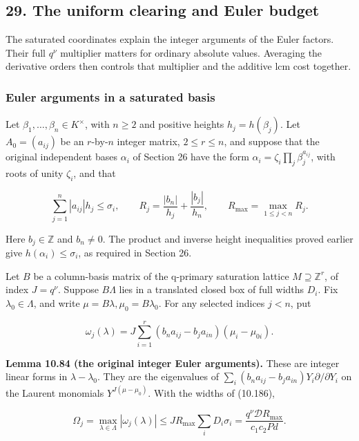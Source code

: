 \documentclass[
  11pt,
  a4paper,
]{article}
\begin{document}
\subsection{29. The uniform clearing and Euler
budget}\label{the-uniform-clearing-and-euler-budget}

The saturated coordinates explain the integer arguments of the Euler
factors. Their full \(q^\nu\) multiplier matters for ordinary absolute
values. Averaging the derivative orders then controls that multiplier
and the additive lcm cost together.

\subsubsection{Euler arguments in a saturated
basis}\label{euler-arguments-in-a-saturated-basis}

Let \(\beta_1,\ldots,\beta_n\in K^\times\), with \(n\ge2\) and positive
heights \(h_j=h(\beta_j)\). Let \(A_0=(a_{ij})\) be an \(r\)-by-\(n\)
integer matrix, \(2\le r\le n\), and suppose that the original
independent bases \(\alpha_i\) of Section 26 have the form
\(\alpha_i=\zeta_i\prod_j\beta_j^{a_{ij}}\), with roots of unity
\(\zeta_i\), and that

\[
\sum_{j=1}^n|a_{ij}|h_j\le\sigma_i,\qquad
R_j=\frac{|b_n|}{h_j}+\frac{|b_j|}{h_n},
\qquad R_{\max}=\max_{1\le j<n}R_j.
\tag{10.218}
\]

Here \(b_j\in\mathbb Z\) and \(b_n\ne0\). The product and inverse height
inequalities proved earlier give \(h(\alpha_i)\le\sigma_i\), as required
in Section 26.

Let \(B\) be a column-basis matrix of the q-primary saturation lattice
\(M\supseteq\mathbb Z^r\), of index \(J=q^\nu\). Suppose \(B\Lambda\)
lies in a translated closed box of full widths \(D_i\). Fix
\(\lambda_0\in\Lambda\), and write \(\mu=B\lambda,\mu_0=B\lambda_0\).
For any selected indices \(j<n\), put

\[
\omega_j(\lambda)
=J\sum_{i=1}^r(b_na_{ij}-b_ja_{in})(\mu_i-\mu_{0i}).
\tag{10.219}
\]

\textbf{Lemma 10.84 (the original integer Euler arguments).} These are
integer linear forms in \(\lambda-\lambda_0\). They are the eigenvalues
of \(\sum_i(b_na_{ij}-b_ja_{in})Y_i\partial/\partial Y_i\) on the
Laurent monomials \(Y^{J(\mu-\mu_0)}\). With the widths of (10.186),

\[
\Omega_j=\max_{\lambda\in\Lambda}|\omega_j(\lambda)|
\le J R_{\max}\sum_iD_i\sigma_i
=\frac{q^\nu\mathcal D R_{\max}}{c_1c_2Pd}.
\tag{10.220}
\]
\end{document}
